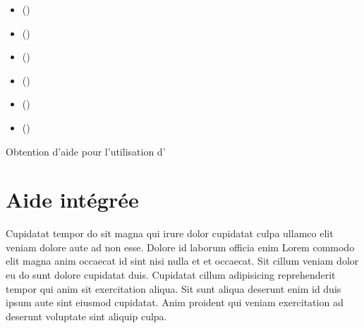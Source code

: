 \documentclass[a4paper,10pt,french]{sphinxmanual}
\begin{document}
\begin{sphinxShadowBox}
\begin{itemize}
\item {} 
\label{\detokenize{docs/refs/autocad-help:id1}}{\hyperref[\detokenize{docs/refs/autocad-help:aide-integree}]{}} ()

\item {} 
\label{\detokenize{docs/refs/autocad-help:id2}}{\hyperref[\detokenize{docs/refs/autocad-help:aide-en-ligne-internet}]{}} ()

\item {} 
\label{\detokenize{docs/refs/autocad-help:id3}}{\hyperref[\detokenize{docs/refs/autocad-help:livres}]{}} ()

\item {} 
\label{\detokenize{docs/refs/autocad-help:id4}}{\hyperref[\detokenize{docs/refs/autocad-help:fichiers-pdf}]{}} ()

\item {} 
\label{\detokenize{docs/refs/autocad-help:id5}}{\hyperref[\detokenize{docs/refs/autocad-help:videos}]{}} ()

\item {} 
\label{\detokenize{docs/refs/autocad-help:id6}}{\hyperref[\detokenize{docs/refs/autocad-help:forums-d-echange-d-informations-fichiers-autres-sites-ou-medias-d-entraide}]{}} ()

\end{itemize}
\end{sphinxShadowBox}

Obtention d'aide pour l'utilisation d'


\section{Aide intégrée}
\label{\detokenize{docs/refs/autocad-help:aide-integree}}
Cupidatat tempor do sit magna qui irure dolor cupidatat culpa ullamco elit veniam dolore aute ad non esse. Dolore id laborum officia enim Lorem commodo elit magna anim occaecat id sint nisi nulla et et occaecat. Sit cillum veniam dolor eu do sunt dolore cupidatat duis. Cupidatat cillum adipisicing reprehenderit tempor qui anim sit exercitation aliqua. Sit sunt aliqua deserunt enim id duis ipsum aute sint eiusmod cupidatat. Anim proident qui veniam exercitation ad deserunt voluptate sint aliquip culpa.
\end{document}
